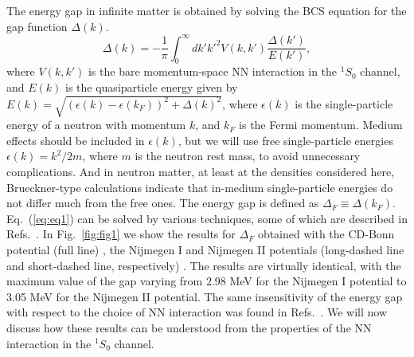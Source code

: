 \begin{multicols}{2}
The energy gap in infinite matter is obtained by solving the BCS equation 
for the gap function $\Delta(k)$.  
\begin{equation}
      \Delta(k)=-\frac{1}{\pi}\int_{0}^{\infty}dk'k'^2 
                 V(k,k')\frac{\Delta(k')}{E(k')}, 
      \label{eq:eq1}
\end{equation}
where $V(k,k')$ is the bare momentum-space NN interaction in the 
$^1S_0$ channel, and $E(k)$ is the quasiparticle energy given by 
$E(k)=\sqrt{(\epsilon(k)-\epsilon(k_F))^2+\Delta(k)^2}$, where 
$\epsilon(k)$ is the single-particle energy of a neutron with 
momentum $k$, and $k_F$ is the Fermi momentum.  
Medium effects should 
be included in $\epsilon(k)$, but we will use free single-particle 
energies $\epsilon(k)=k^{2}/2m$, where $m$ is the neutron rest mass,  
to avoid unnecessary complications.  
And in neutron matter, at least at the densities 
considered here,  Brueckner-type calculations \cite{elg96} 
indicate that in-medium single-particle energies do not 
differ much from the free ones. 
The energy gap is defined as $\Delta_F\equiv \Delta(k_F)$.  
Eq.\ (\ref{eq:eq1}) can be 
solved by various techniques, some of which are described in 
Refs.\ \cite{elg96,khodel96}.  
In Fig.\ \ref{fig:fig1} we show 
the results for $\Delta_F$ obtained with the CD-Bonn potential (full line) 
\cite{mach96},  
the Nijmegen I and Nijmegen II potentials (long-dashed line and 
short-dashed line, respectively) \cite{nijm94}. 
The results are virtually identical, with the maximum value 
of the gap varying from 2.98 MeV for the Nijmegen I potential to 3.05 MeV 
for the Nijmegen II potential.  The same insensitivity of the energy gap 
with respect to 
the choice of NN interaction was found in Refs.\ 
\cite{baldo90,elg96,khodel96}. 
We will now discuss how these results can be understood 
from the properties of the NN interaction in the $^1S_0$ channel.


\end{multicols}
